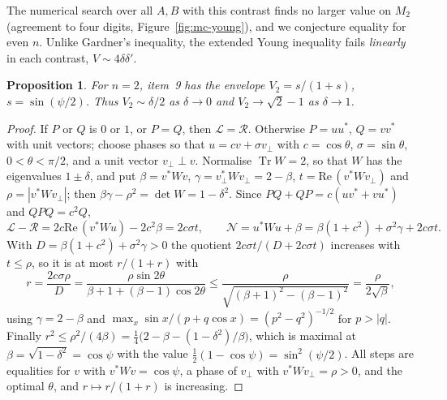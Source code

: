 \documentclass[11pt]{article}
\DeclareMathOperator{\Tr}{Tr}
\newcommand{\cL}{\mathcal{L}}
\newcommand{\cR}{\mathcal{R}}
\newcommand{\cN}{\mathcal{N}}
\renewcommand{\Re}{\mathrm{Re}\,}
\theoremstyle{plain}
\newtheorem{proposition}[theorem]{Proposition}
\theoremstyle{definition}
\theoremstyle{remark}
\begin{document}
\noindent The numerical search over all $A,B$ with this contrast finds no larger value on $M_2$ (agreement to four
digits, Figure~\ref{fig:mc-young}), and we conjecture equality for even $n$. Unlike Gardner's inequality, the extended Young
inequality fails \emph{linearly} in each contrast, $V\sim4\delta\delta'$.

\begin{proposition}\label{prop:abed}
For $n=2$, item~9 has the envelope $V_2=s/(1+s)$, $s=\sin(\psi/2)$. Thus $V_2\sim\delta/2$ as $\delta\to0$ and
$V_2\to\sqrt2-1$ as $\delta\to1$.
\end{proposition}
\begin{proof}
If $P$ or $Q$ is $0$ or $1$, or $P=Q$, then $\cL=\cR$. Otherwise $P=uu^*$, $Q=vv^*$ with unit vectors; choose phases so that
$u=cv+\sigma v_\perp$ with $c=\cos\theta$, $\sigma=\sin\theta$, $0<\theta<\pi/2$, and a unit vector $v_\perp\perp v$.
Normalise $\Tr W=2$, so that $W$ has the eigenvalues $1\pm\delta$, and put $\beta=v^*Wv$, $\gamma=v_\perp^*Wv_\perp=2-\beta$,
$t=\Re(v^*Wv_\perp)$ and $\rho=|v^*Wv_\perp|$; then $\beta\gamma-\rho^2=\det W=1-\delta^2$. Since $PQ+QP=c(uv^*+vu^*)$
and $QPQ=c^2Q$,
\[
  \cL-\cR=2c\Re(v^*Wu)-2c^2\beta=2c\sigma t,\qquad \cN=u^*Wu+\beta=\beta(1+c^2)+\sigma^2\gamma+2c\sigma t .
\]
With $D=\beta(1+c^2)+\sigma^2\gamma>0$ the quotient $2c\sigma t/(D+2c\sigma t)$ increases with $t\le\rho$, so it is at most
$r/(1+r)$ with
\[
  r=\frac{2c\sigma\rho}{D}=\frac{\rho\sin2\theta}{\beta+1+(\beta-1)\cos2\theta}\le\frac{\rho}{\sqrt{(\beta+1)^2-(\beta-1)^2}}
  =\frac\rho{2\sqrt\beta},
\]
using $\gamma=2-\beta$ and $\max_x\sin x/(p+q\cos x)=(p^2-q^2)^{-1/2}$ for $p>|q|$. Finally
$r^2\le\rho^2/(4\beta)=\frac14\bigl(2-\beta-(1-\delta^2)/\beta\bigr)$, which is maximal at $\beta=\sqrt{1-\delta^2}=\cos\psi$
with the value $\frac12(1-\cos\psi)=\sin^2(\psi/2)$. All steps are equalities for $v$ with $v^*Wv=\cos\psi$, a phase of
$v_\perp$ with $v^*Wv_\perp=\rho>0$, and the optimal $\theta$, and $r\mapsto r/(1+r)$ is increasing.
\end{proof}
\end{document}
